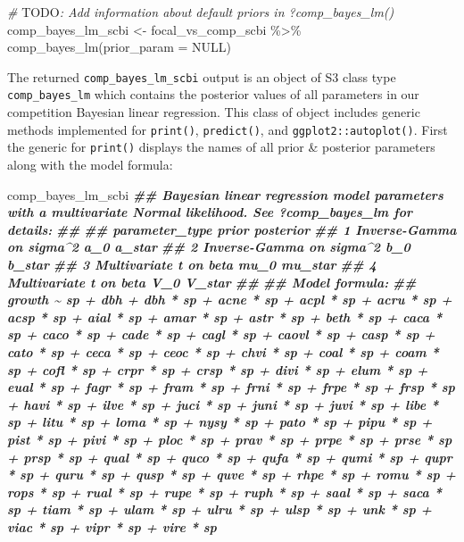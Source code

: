 \documentclass[12pt]{article}
\newenvironment{Shaded}{\begin{snugshade}}{\end{snugshade}}
\newcommand{\AlertTok}[1]{\textcolor[rgb]{0.94,0.16,0.16}{#1}}
\newcommand{\AttributeTok}[1]{\textcolor[rgb]{0.77,0.63,0.00}{#1}}
\newcommand{\CommentTok}[1]{\textcolor[rgb]{0.56,0.35,0.01}{\textit{#1}}}
\newcommand{\ConstantTok}[1]{\textcolor[rgb]{0.00,0.00,0.00}{#1}}
\newcommand{\DocumentationTok}[1]{\textcolor[rgb]{0.56,0.35,0.01}{\textbf{\textit{#1}}}}
\newcommand{\FunctionTok}[1]{\textcolor[rgb]{0.00,0.00,0.00}{#1}}
\newcommand{\NormalTok}[1]{#1}
\newcommand{\OtherTok}[1]{\textcolor[rgb]{0.56,0.35,0.01}{#1}}
\newcommand{\SpecialCharTok}[1]{\textcolor[rgb]{0.00,0.00,0.00}{#1}}
\begin{document}
\begin{Shaded}
\begin{Highlighting}[]
\CommentTok{\# }\AlertTok{TODO}\CommentTok{: Add information about default priors in ?comp\_bayes\_lm()}
\NormalTok{comp\_bayes\_lm\_scbi }\OtherTok{\textless{}{-}}\NormalTok{ focal\_vs\_comp\_scbi }\SpecialCharTok{\%\textgreater{}\%}
  \FunctionTok{comp\_bayes\_lm}\NormalTok{(}\AttributeTok{prior\_param =} \ConstantTok{NULL}\NormalTok{)}
\end{Highlighting}
\end{Shaded}

The returned \texttt{comp\_bayes\_lm\_scbi} output is an object of S3
class type \texttt{comp\_bayes\_lm} which contains the posterior values
of all parameters in our competition Bayesian linear regression. This
class of object includes generic methods implemented for
\texttt{print()}, \texttt{predict()}, and \texttt{ggplot2::autoplot()}.
First the generic for \texttt{print()} displays the names of all prior
\& posterior parameters along with the model formula:

\begin{Shaded}
\begin{Highlighting}[]
\NormalTok{comp\_bayes\_lm\_scbi}
\DocumentationTok{\#\# Bayesian linear regression model parameters with a multivariate Normal likelihood. See ?comp\_bayes\_lm for details:}
\DocumentationTok{\#\# }
\DocumentationTok{\#\#   parameter\_type           prior posterior}
\DocumentationTok{\#\# 1 Inverse{-}Gamma on sigma\^{}2 a\_0   a\_star   }
\DocumentationTok{\#\# 2 Inverse{-}Gamma on sigma\^{}2 b\_0   b\_star   }
\DocumentationTok{\#\# 3 Multivariate t on beta   mu\_0  mu\_star  }
\DocumentationTok{\#\# 4 Multivariate t on beta   V\_0   V\_star   }
\DocumentationTok{\#\# }
\DocumentationTok{\#\# Model formula:}
\DocumentationTok{\#\# growth \textasciitilde{} sp + dbh + dbh * sp + acne * sp + acpl * sp + acru * sp + acsp * sp + aial * sp + amar * sp + astr * sp + beth * sp + caca * sp + caco * sp + cade * sp + cagl * sp + caovl * sp + casp * sp + cato * sp + ceca * sp + ceoc * sp + chvi * sp + coal * sp + coam * sp + cofl * sp + crpr * sp + crsp * sp + divi * sp + elum * sp + eual * sp + fagr * sp + fram * sp + frni * sp + frpe * sp + frsp * sp + havi * sp + ilve * sp + juci * sp + juni * sp + juvi * sp + libe * sp + litu * sp + loma * sp + nysy * sp + pato * sp + pipu * sp + pist * sp + pivi * sp + ploc * sp + prav * sp + prpe * sp + prse * sp + prsp * sp + qual * sp + quco * sp + qufa * sp + qumi * sp + qupr * sp + quru * sp + qusp * sp + quve * sp + rhpe * sp + romu * sp + rops * sp + rual * sp + rupe * sp + ruph * sp + saal * sp + saca * sp + tiam * sp + ulam * sp + ulru * sp + ulsp * sp + unk * sp + viac * sp + vipr * sp + vire * sp}
\end{Highlighting}
\end{Shaded}
\end{document}
